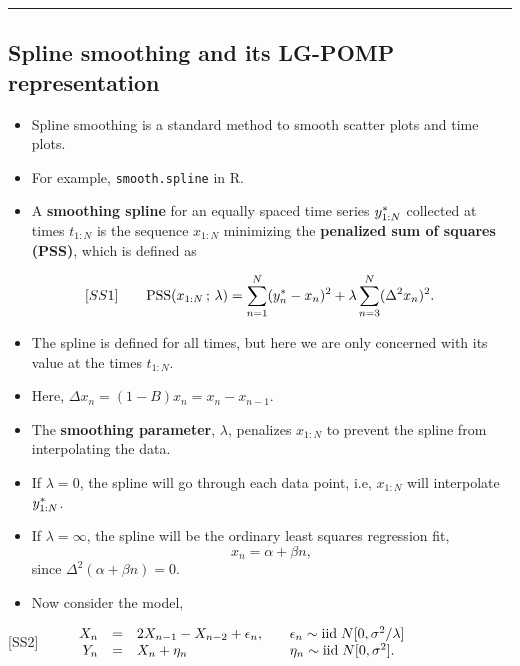 \documentclass[]{article}
\begin{document}
\begin{center}\rule{0.5\linewidth}{\linethickness}\end{center}

\subsection{Spline smoothing and its LG-POMP
representation}\label{spline-smoothing-and-its-lg-pomp-representation}

\begin{itemize}
\item
  Spline smoothing is a standard method to smooth scatter plots and time
  plots.
\item
  For example, \texttt{smooth.spline} in R.
\item
  A \textbf{smoothing spline} for an equally spaced time series
  \(y_{1:N}^*\) collected at times \(t_{1:N}\) is the sequence
  \(x_{1:N}\) minimizing the \textbf{penalized sum of squares (PSS)},
  which is defined as
\end{itemize}

$$[SS1]
\quad\quad \displaystyle   \mathrm{PSS}(x_{1:N}\, ; \,\lambda)  = \sum_{n=1}^N(y_n^*-x_n)^2 + \lambda\sum_{n=3}^N(\Delta^2 x_n)^2.$$

\begin{itemize}
\item
  The spline is defined for all times, but here we are only concerned
  with its value at the times \(t_{1:N}\).
\item
  Here, \(\Delta x_n = (1-B)x_n = x_n - x_{n-1}.\)
\item
  The \textbf{smoothing parameter}, \(\lambda\), penalizes \(x_{1:N}\)
  to prevent the spline from interpolating the data.
\item
  If \(\lambda=0\), the spline will go through each data point, i.e,
  \(x_{1:N}\) will interpolate \(y_{1:N}^*\).
\item
  If \(\lambda=\infty\), the spline will be the ordinary least squares
  regression fit, \[ x_n = \alpha + \beta n,\] since
  \(\Delta^2(\alpha + \beta n) = 0\).
\item
  Now consider the model,
\end{itemize}

{[}SS2{]}
\(\quad\quad \begin{array}{rclcl} X_n &=& 2X_{n-1}-X_{n-2} + \epsilon_n, & & \epsilon_n\sim \mathrm{iid}\; N[0,\sigma^2/\lambda]\\ Y_n &=& X_n + \eta_n & & \eta_n\sim \mathrm{iid}\; N[0,\sigma^2]. \end{array}\)
\end{document}

